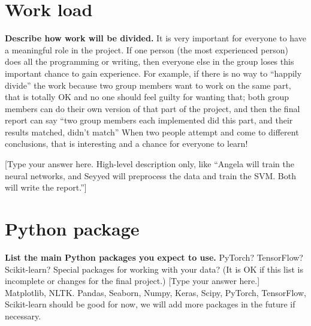 \documentclass[a4paper,11pt]{article}
\begin{document}
\section{Work load}
\textbf{Describe how work will be divided.} It is very important for everyone to have a meaningful role in the project. If one person (the most experienced person) does all the programming or writing, then everyone else in the group loses this important chance to gain experience. For example, if there is no way to “happily divide” the work because two group members want to work on the same part, that is totally OK and no one should feel guilty for wanting that; both group members can do their own version of that part of the project, and then the final report can say “two group members each implemented did this part, and their results {matched, didn’t match}” When two people attempt and come to different conclusions, that is interesting and a chance for everyone to learn!

[Type your answer here. High-level description only, like “Angela will train the neural networks, and Seyyed will preprocess the data and train the SVM. Both will write the report.”]
\\


\newpage

\section{Python package}
\textbf{List the main Python packages you expect to use.} PyTorch? TensorFlow? Scikit-learn? Special packages for working with your data? (It is OK if this list is incomplete or changes for the final project.) 
[Type your answer here.]
\\

Matplotlib, NLTK. Pandas, Seaborn, Numpy, Keras, Scipy, PyTorch, TensorFlow, Scikit-learn should be good for now, we will add more packages in the future if necessary.

\pagebreak


\newpage


\nocite{*}
\end{document}

